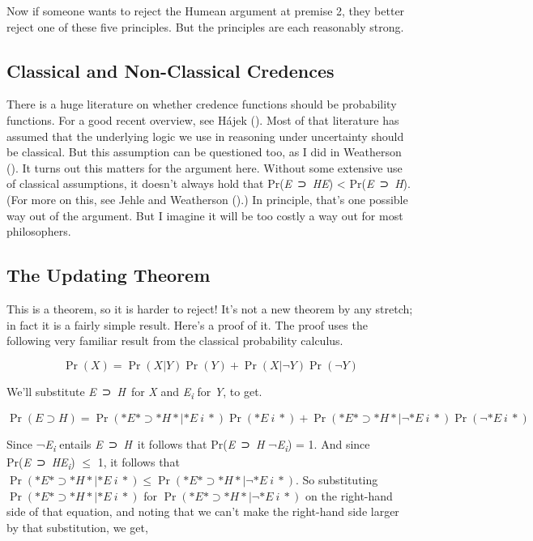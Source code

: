 \documentclass[
  10pt,
  letterpaper,
  DIV=11,
  numbers=noendperiod,
  twoside]{scrartcl}
\begin{document}
Now if someone wants to reject the Humean argument at premise 2, they
better reject one of these five principles. But the principles are each
reasonably strong.

\subsection{Classical and Non-Classical
Credences}\label{classical-and-non-classical-credences}

There is a huge literature on whether credence functions should be
probability functions. For a good recent overview, see Hájek
(). Most of that literature has assumed
that the underlying logic we use in reasoning under uncertainty should
be classical. But this assumption can be questioned too, as I did in
Weatherson (). It turns out this
matters for the argument here. Without some extensive use of classical
assumptions, it doesn't always hold that
Pr(\emph{E}~⊃~\emph{H}\textbar{}\emph{E}) \textless{}
Pr(\emph{E}~⊃~\emph{H}). (For more on this, see Jehle and Weatherson
().) In principle, that's one
possible way out of the argument. But I imagine it will be too costly a
way out for most philosophers.

\subsection{The Updating Theorem}\label{the-updating-theorem}

This is a theorem, so it is harder to reject! It's not a new theorem by
any stretch; in fact it is a fairly simple result. Here's a proof of it.
The proof uses the following very familiar result from the classical
probability calculus.

\[
\Pr(X) = \Pr(X | Y)\Pr(Y) + \Pr(X | \neg Y)\Pr(\neg Y)
\]

We'll substitute \emph{E}~⊃~\emph{H}~for \emph{X} and
\emph{E\textsubscript{i}} for \emph{Y}, to get.

\[
\Pr(E \supset H) = \Pr(*E* ⊃ *H*| *E~i~*)\Pr(*E~i~*) + \Pr(*E* ⊃ *H*| \neg *E~i~*)\Pr(\neg *E~i~*)
\]

Since ¬\emph{E\textsubscript{i}} entails \emph{E}~⊃~\emph{H}~it follows
that Pr(\emph{E}~⊃~\emph{H}\textbar{} ¬\emph{E\textsubscript{i}}) = 1.
And since Pr(\emph{E}~⊃~\emph{H}\textbar{}\emph{E\textsubscript{i}})
\(\leq\) 1, it follows that
\(\Pr(*E* ⊃ *H*| *E~i~*) \leq \Pr(*E* ⊃ *H*| \neg *E~i~*)\). So
substituting \(\Pr(*E* ⊃ *H*| *E~i~*)\) for
\(\Pr(*E* ⊃ *H*| \neg *E~i~*)\) on the right-hand side of that equation,
and noting that we can't make the right-hand side larger by that
substitution, we get,
\end{document}
